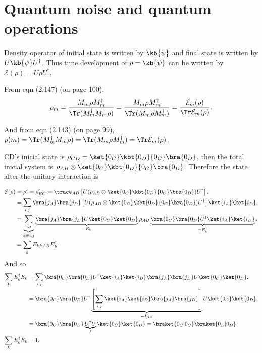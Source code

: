 \chapter{Quantum noise and quantum operations}

	Density operator of initial state is written by $\kb{\psi}$ and final state is written by $U\kb{\psi}U^\dagger$. Thus 
	time development of $\rho = \kb{\psi}$ can be written by $\mathcal{E}(\rho) = U\rho U^\dagger$.


	From eqn (2.147) (on page 100),
	\begin{align*}
		\rho_m = \frac{M_m \rho M_m^\dagger}{\Tr (M_m^\dagger  M_m\rho ) }
				= \frac{M_m \rho M_m^\dagger}{\Tr ( M_m \rho M_m^\dagger ) }
				= \frac{\mathcal{E}_m (\rho)}{\Tr \mathcal{E}_m (\rho)}.
	\end{align*}

	And from eqn (2.143) (on page 99), $p(m) = \Tr (M_m^\dagger M_m \rho) = \Tr (M_m \rho M_m^\dagger) = \Tr \mathcal{E}_m (\rho)$.


	CD's inicial state is $ \rho_{CD} = \ket{0_C}\kbt{0_D}{0_C}\bra{0_D} $, then the total inicial system is $ 
	\rho_{AB}\otimes\ket{0_C}\kbt{0_D}{0_C}\bra{0_D} $. Therefore the state after the unitary interaction is	

		\begin{align*}
			\mathcal{E}(\rho) &= \rho' = \rho'_{BC} = \trace_{AD}\left[ U(\rho_{AB} \otimes \ket{0_C}\kbt{0_D}{0_C}\bra{0_D} 
			)U^\dagger \right]. \\
			&= \sum_{i,j}\bra{j_A}\bra{j_D}\left[ U(\rho_{AB} \otimes \ket{0_C}\kbt{0_D}{0_C}\bra{0_D} )U^\dagger \right] 
			\ket{i_A}\ket{i_D}. \\
			&= \underbrace{\sum_{i,j}}_{k \equiv i,j} \underbrace{\bra{j_A}\bra{j_D} U \ket{0_C}\ket{0_D}}_{\equiv E_k} 
			\rho_{AB} \underbrace{\bra{0_C}\bra{0_D}U^\dagger\ket{i_A}\ket{i_D}}_{\equiv E_k^\dagger}.\\
			&= \sum_{k} E_k \rho_{AB} E_k^\dagger.
		\end{align*} 
	And so
		\begin{align*}
			\sum_{k} E_k^\dagger E_k 
			&= \sum_{i,j} \bra{0_C}\bra{0_D}U^\dagger\ket{i_A}\ket{i_D} \bra{j_A}\bra{j_D} U \ket{0_C}\ket{0_D}. \\
			&= \bra{0_C}\bra{0_D}U^\dagger \underbrace{\left[ \sum_{i,j}  \ket{i_A}\ket{i_D} 
			\bra{j_A}\bra{j_D}\right]}_{=I_{AD}} U \ket{0_C}\ket{0_D}. \\
			&= \bra{0_C}\bra{0_D} \underbrace{U^\dagger U}_{I} \ket{0_C}\ket{0_D} = \braket{0_C|0_C}\braket{0_D|0_D}\\
			\sum_{k} E_k^\dagger E_k  &=1.
		\end{align*}


